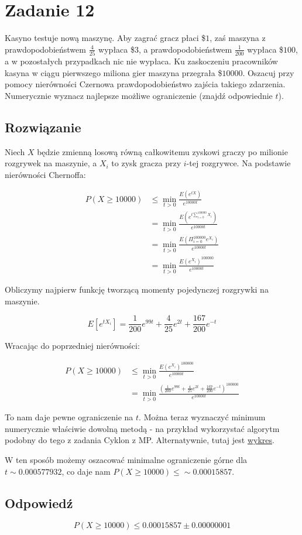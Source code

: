 \section{Zadanie 12}

Kasyno testuje nową maszynę. Aby zagrać gracz płaci \$\(1\), zaś maszyna z prawdopodobieństwem \(\frac{4}{25}\) wypłaca \$\(3\), a prawdopodobieństwem \(\frac{1}{200}\) wypłaca \$\(100\), a w pozostałych przypadkach nic nie wypłaca. Ku zaskoczeniu pracowników kasyna w ciągu pierwszego miliona gier maszyna przegrała \$\(10000\). Oszacuj przy pomocy nierówności Czernowa prawdopodobieństwo zajścia takiego zdarzenia. Numerycznie wyznacz najlepsze możliwe ograniczenie (znajdź odpowiednie \(t\)).

\subsection*{Rozwiązanie}

Niech \(X\) będzie zmienną losową równą całkowitemu zyskowi graczy po milionie rozgrywek na maszynie, a \(X_i\) to zysk gracza przy \(i\)-tej rozgrywce. Na podstawie nierówności Chernoffa:

\begin{align*}
	P(X \geq 10000) & \leq \min_{t>0}\frac{E(e^{tX})}{e^{10000t}}                   \\
	                & = \min_{t>0}\frac{E(e^{t\sum_{i=0}^{100000}X_i})}{e^{10000t}} \\
	                & = \min_{t>0}\frac{E(\Pi_{i=0}^{100000}e^{X_i})}{e^{10000t}}   \\
	                & = \min_{t>0}\frac{E(e^{X_i})^{100000}}{e^{10000t}}
\end{align*}

Obliczymy najpierw funkcję tworzącą momenty pojedynczej rozgrywki na maszynie.

\[
	E[e^{tX_i}] = \frac{1}{200}e^{99t} + \frac{4}{25}e^{2t} + \frac{167}{200}e^{-t}
\]

Wracając do poprzedniej nierówności:

\begin{align*}
	P(X \geq 10000) & \leq  \min_{t>0}\frac{E(e^{X_i})^{100000}}{e^{10000t}}                                                      \\
	                & = \min_{t>0}\frac{(\frac{1}{200}e^{99t} + \frac{4}{25}e^{2t} + \frac{167}{200}e^{-t})^{100000}}{e^{10000t}}
\end{align*}

To nam daje pewne ograniczenie na \(t\). Można teraz wyznaczyć minimum numerycznie właściwie dowolną metodą - na przykład wykorzystać algorytm podobny do tego z zadania Cyklon z MP. Alternatywnie, tutaj jest \href{https://www.desmos.com/calculator/owyz2jam2l}{wykres}.

W ten sposób możemy oszacować minimalne ograniczenie górne dla \(t \sim 0.000577932\), co daje nam \(P(X \geq 10000) \leq \sim0.00015857\).

\subsection*{Odpowiedź}
\[
	\boxed{P(X \geq 10000) \leq 0.00015857 \pm 0.00000001}
\]
